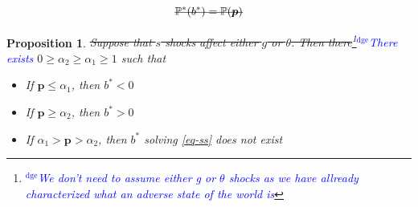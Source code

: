\documentclass[12pt]{article}
\newcommand{\dge}[1]{\textcolor{blue}{$^{\textrm{dge}}${#1}}}
\newtheorem{proposition}[theorem]{Proposition}
\begin{document}
\begin{equation}
\label{eq-ss}
\text{\st{$ \mathbb{P}^*(b^*) =  {\mathbb P}(\bm{p})$}}
\end{equation}

\begin{proposition}\label{prop:ssexistence}
\st{Suppose that $s$ shocks affect either $g$ or $\theta$.  Then there}\footnote{\dge{We don't need to assume either g or $\theta$ shocks as we have allready characterized what an adverse state of the world is}}\dge{There exists} $0 \geq \alpha_2\geq\alpha_1\geq1$
such that
  \begin{itemize}
   \item[a.] If $\bm{p}\leq \alpha_1$, then $b^* < 0$ %
   \item[b.] If $\bm{p} \geq \alpha_2$, then $b^* > 0$ %
   \item[c.] If $\alpha_1>\bm{p}>\alpha_2$, then $b^*$ solving \eqref{eq-ss}  does not exist
  \end{itemize}

\end{proposition}
\end{document}

